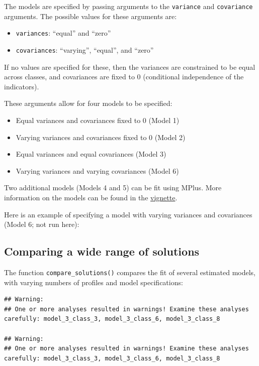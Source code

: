 \documentclass[man]{apa6}
\providecommand{\tightlist}{%
  \setlength{\itemsep}{0pt}\setlength{\parskip}{0pt}}
\begin{document}
The models are specified by passing arguments to the \texttt{variance} and \texttt{covariance}
arguments. The possible values for these arguments are:

\begin{itemize}
\tightlist
\item
  \texttt{variances}: ``equal'' and ``zero''
\item
  \texttt{covariances}: ``varying'', ``equal'', and ``zero''
\end{itemize}

If no values are specified for these, then the variances are constrained to be
equal across classes, and covariances are fixed to 0 (conditional independence
of the indicators).

These arguments allow for four models to be specified:

\begin{itemize}
\tightlist
\item
  Equal variances and covariances fixed to 0 (Model 1)
\item
  Varying variances and covariances fixed to 0 (Model 2)
\item
  Equal variances and equal covariances (Model 3)
\item
  Varying variances and varying covariances (Model 6)
\end{itemize}

Two additional models (Models 4 and 5) can be fit using MPlus. More information
on the models can be found in the
\href{https://data-edu.github.io/tidyLPA/articles/Introduction_to_tidyLPA.html}{vignette}.

Here is an example of specifying a model with varying variances and covariances
(Model 6; not run here):

\hypertarget{comparing-a-wide-range-of-solutions}{%
\subsection{Comparing a wide range of solutions}\label{comparing-a-wide-range-of-solutions}}

The function \texttt{compare\_solutions()} compares the fit of several estimated models,
with varying numbers of profiles and model specifications:

\begin{verbatim}
## Warning: 
## One or more analyses resulted in warnings! Examine these analyses carefully: model_3_class_3, model_3_class_6, model_3_class_8

## Warning: 
## One or more analyses resulted in warnings! Examine these analyses carefully: model_3_class_3, model_3_class_6, model_3_class_8
\end{verbatim}
\end{document}

